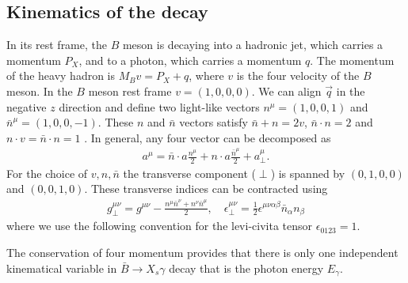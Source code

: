 \subsection{Kinematics of the decay} 
In its rest frame, the $B$ meson is decaying into a hadronic jet, which carries a momentum $P_X$, and to a photon, which carries a momentum $q$. The momentum of the heavy hadron is $M_{B} v=P_{X}+q$, where $v$ is the four velocity of the $B$ meson. In the $B$ meson rest frame $v=(1,0,0,0)$. We can align $\vec{q}$ in the negative $z$ direction and define two light-like vectors $n^{\mu}=(1,0,0,1)$ and $\bar{n}^{\mu}=(1,0,0,-1)$. These $n$ and $\bar{n}$ vectors satisfy $\bar{n}+n=2v$, $\bar{n}\cdot n=2$ and $n\cdot v=\bar{n}\cdot n=1$ \cite{Paz:2009ut}. In general, any four vector can be decomposed as 
\begin{eqnarray}\label{eqn:4vec_decomp}
a^{\mu}=\bar{n} \cdot a \frac{n^{\mu}}{2}+n \cdot a \frac{\bar{n}^{\mu}}{2}+a_{\perp}^{\mu}.
\end{eqnarray}
For the choice of $v,n,\bar{n}$ the transverse component ($\perp$) is spanned by $(0,1,0,0)$ and $(0,0,1,0)$. These transverse indices can be contracted using
\begin{eqnarray}\label{eqn:Transverse_indices_contract}
g_{\perp}^{\mu \nu}=g^{\mu \nu}-\frac{n^{\mu} \bar{n}^{\nu}+n^{\nu} \bar{n}^{\mu}}{2}, \quad \epsilon_{\perp}^{\mu \nu}=\frac{1}{2} \epsilon^{\mu \nu \alpha \beta} \bar{n}_{\alpha} n_{\beta}
\end{eqnarray}
where we use the following convention for the levi-civita tensor $\epsilon_{0123}=1$.\par
The conservation of four momentum provides that there is only one independent kinematical variable in $\bar{B}\rightarrow X_s\gamma$ decay that is the photon energy $E_{\gamma}$.

